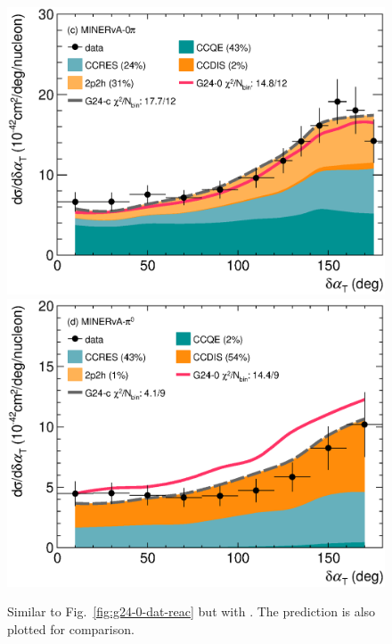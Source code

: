 \begin{figure}
    \includegraphics[width=\dbfigwid\textwidth]{figures/tuning/0026-min_0pi_dalphat_reac_decomp_covfix.eps}
    \includegraphics[width=\dbfigwid\textwidth]{figures/tuning/0026-min_pi0_dalphat_reac_decomp_covfix.eps}
    \caption{\label{fig:g24-c-dat-reac} 
    Similar to Fig.~\ref{fig:g24-0-dat-reac} but with \gC.  The \gZero prediction is also plotted for comparison. 
    } 


\end{figure}
